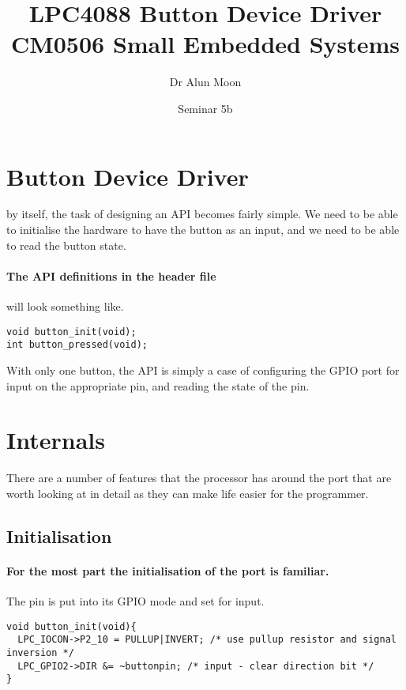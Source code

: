 \documentclass[a4paper]{tufte-handout}
\title{LPC4088 Button Device Driver\\\small{CM0506 Small Embedded Systems}}
\author{Dr Alun Moon}
\date{Seminar 5b}
\begin{document}
\maketitle

\section{Button Device Driver}
 by itself,  the task of designing an API becomes fairly
simple.  We need to be able to initialise the hardware to have the
button as an input, and we need to be able to read the button state.

\paragraph{The API definitions in the header file} will look something
like.
\begin{verbatim}
void button_init(void);
int button_pressed(void);
\end{verbatim}
With only one button, the API is simply a case of configuring the GPIO
port for input on the appropriate pin, and reading the state of the
pin.

\section{Internals}
  There are a number of features that the processor has
around the port that are worth looking at in detail as they can make
life easier for the programmer.
\subsection{Initialisation}
\paragraph{For the most part the initialisation of the port is
  familiar.}  The pin is put into its GPIO mode and set for input.
\begin{verbatim}
void button_init(void){
  LPC_IOCON->P2_10 = PULLUP|INVERT; /* use pullup resistor and signal inversion */
  LPC_GPIO2->DIR &= ~buttonpin; /* input - clear direction bit */
}
\end{verbatim}
\end{document}
